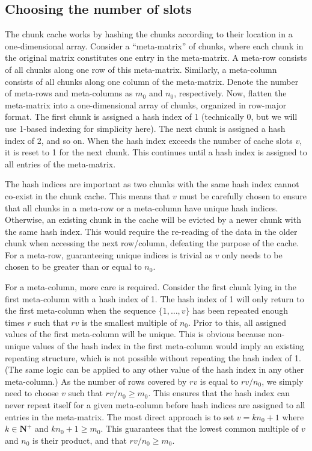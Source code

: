 \documentclass{article}
\begin{document}
\subsection{Choosing the number of slots}
The chunk cache works by hashing the chunks according to their location in a one-dimensional array.
Consider a ``meta-matrix'' of chunks, where each chunk in the original matrix constitutes one entry in the meta-matrix.
A meta-row consists of all chunks along one row of this meta-matrix.
Similarly, a meta-column consists of all chunks along one column of the meta-matrix. 
Denote the number of meta-rows and meta-columns as $m_0$ and $n_0$, respectively.
Now, flatten the meta-matrix into a one-dimensional array of chunks, organized in row-major format.
The first chunk is assigned a hash index of 1 (technically 0, but we will use 1-based indexing for simplicity here).
The next chunk is assigned a hash index of 2, and so on.
When the hash index exceeds the number of cache slots $v$, it is reset to 1 for the next chunk.
This continues until a hash index is assigned to all entries of the meta-matrix.

The hash indices are important as two chunks with the same hash index cannot co-exist in the chunk cache.
This means that $v$ must be carefully chosen to ensure that all chunks in a meta-row or a meta-column have unique hash indices.
Otherwise, an existing chunk in the cache will be evicted by a newer chunk with the same hash index.
This would require the re-reading of the data in the older chunk when accessing the next row/column, defeating the purpose of the cache.
For a meta-row, guaranteeing unique indices is trivial as $v$ only needs to be chosen to be greater than or equal to $n_0$.

For a meta-column, more care is required.
Consider the first chunk lying in the first meta-column with a hash index of 1.
The hash index of 1 will only return to the first meta-column when the sequence $\{1, \ldots, v\}$ has been repeated enough times $r$ such that $rv$ is the smallest multiple of $n_0$.
Prior to this, all assigned values of the first meta-column will be unique.
This is obvious because non-unique values of the hash index in the first meta-column would imply an existing repeating structure, which is not possible without repeating the hash index of 1.
(The same logic can be applied to any other value of the hash index in any other meta-column.)
As the number of rows covered by $rv$ is equal to $rv/n_0$, we simply need to choose $v$ such that $rv/n_0 \ge m_0$.
This ensures that the hash index can never repeat itself for a given meta-column before hash indices are assigned to all entries in the meta-matrix.
The most direct approach is to set $v = kn_0 + 1$  where $k \in \mathbf{N}^+$ and $kn_0 +1 \ge m_0$.
This guarantees that the lowest common multiple of $v$ and $n_0$ is their product, and that $rv/n_0 \ge m_0$.
\end{document}
